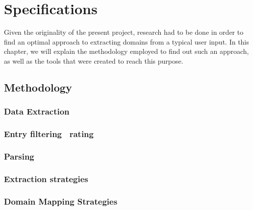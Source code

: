 \chapter{Specifications} %
\label{cha:specifications}

Given the originality of the present project, research had to be done in order to find an optimal approach to extracting domains from a typical user input. In this chapter, we will explain the methodology employed to find out such an approach, as well as the tools that were created to reach this purpose.

\section{Methodology} %
\label{sec:methodology}

\subsection{Data Extraction} %
\label{sub:data_extraction}


\subsection{Entry filtering \amper\ rating} %
\label{sub:entry_filtering_rating}


\subsection{Parsing} %
\label{sub:parsing}


\subsection{Extraction strategies} %
\label{sub:extraction_strategies}


\subsection{Domain Mapping Strategies} %
\label{sub:domain_mapping_strategies}


